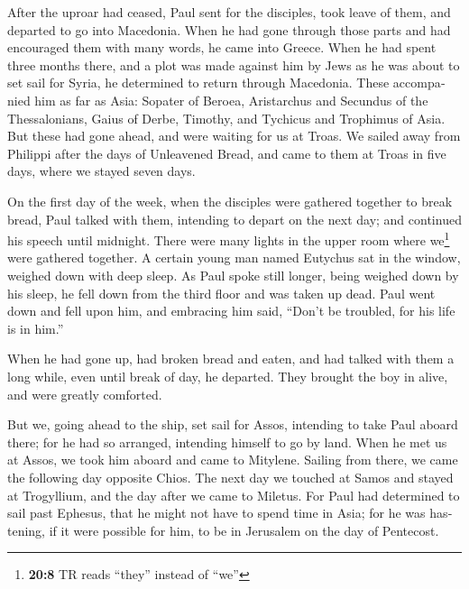 \begin{paracol}{2}
\begin{otherlanguage}{english}
 After the uproar had ceased, Paul sent for the disciples,
took leave of them, and departed to go into Macedonia. 
When he had gone through those parts and had encouraged them with many
words, he came into Greece.  When he had spent three
months there, and a plot was made against him by Jews as he was about to
set sail for Syria, he determined to return through Macedonia.
 These accompanied him as far as Asia: Sopater of Beroea,
Aristarchus and Secundus of the Thessalonians, Gaius of Derbe, Timothy,
and Tychicus and Trophimus of Asia.  But these had gone
ahead, and were waiting for us at Troas.  We sailed away
from Philippi after the days of Unleavened Bread, and came to them at
Troas in five days, where we stayed seven days.

 On the first day of the week, when the disciples were
gathered together to break bread, Paul talked with them, intending to
depart on the next day; and continued his speech until midnight.
 There were many lights in the upper room where
we\footnote{\textbf{20:8} TR reads ``they'' instead of ``we''} were
gathered together.  A certain young man named Eutychus sat
in the window, weighed down with deep sleep. As Paul spoke still longer,
being weighed down by his sleep, he fell down from the third floor and
was taken up dead.  Paul went down and fell upon him, and
embracing him said, ``Don't be troubled, for his life is in him.''

 When he had gone up, had broken bread and eaten, and had
talked with them a long while, even until break of day, he departed.
 They brought the boy in alive, and were greatly
comforted.

 But we, going ahead to the ship, set sail for Assos,
intending to take Paul aboard there; for he had so arranged, intending
himself to go by land.  When he met us at Assos, we took
him aboard and came to Mitylene.  Sailing from there, we
came the following day opposite Chios. The next day we touched at Samos
and stayed at Trogyllium, and the day after we came to Miletus.
 For Paul had determined to sail past Ephesus, that he
might not have to spend time in Asia; for he was hastening, if it were
possible for him, to be in Jerusalem on the day of Pentecost.


\end{otherlanguage}
\end{paracol}
